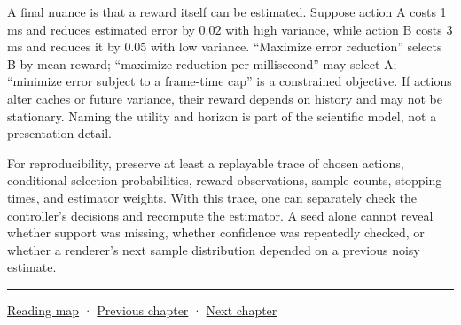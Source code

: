 A final nuance is that a reward itself can be estimated. Suppose action A costs 1 ms and reduces estimated error by \(0.02\) with high variance, while action B costs 3 ms and reduces it by \(0.05\) with low variance. ``Maximize error reduction'' selects B by mean reward; ``maximize reduction per millisecond'' may select A; ``minimize error subject to a frame-time cap'' is a constrained objective. If actions alter caches or future variance, their reward depends on history and may not be stationary. Naming the utility and horizon is part of the scientific model, not a presentation detail.

For reproducibility, preserve at least a replayable trace of chosen actions, conditional selection probabilities, reward observations, sample counts, stopping times, and estimator weights. With this trace, one can separately check the controller's decisions and recompute the estimator. A seed alone cannot reveal whether support was missing, whether confidence was repeatedly checked, or whether a renderer's next sample distribution depended on a previous noisy estimate.

\begin{center}\rule{0.5\linewidth}{0.5pt}\end{center}

\hyperref[volume-reading-map]{Reading map} · \hyperref[02-foundations-ii-ch028-reliable-optimization-and-root-finding]{Previous chapter} · \hyperref[02-foundations-ii-ch030-monte-carlo-estimates-and-uncertainty-metrics]{Next chapter}
